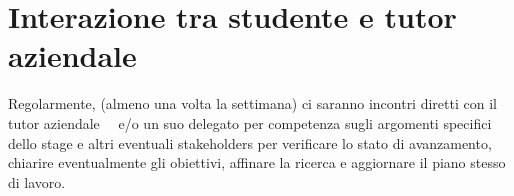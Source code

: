 \section*{Interazione tra studente e tutor aziendale}

Regolarmente, (almeno una volta la settimana) ci saranno incontri diretti con il tutor aziendale \nomeTutorAziendale\ \cognomeTutorAziendale\ e/o un suo delegato per competenza sugli argomenti specifici dello stage e altri eventuali stakeholders per verificare lo stato di avanzamento, chiarire eventualmente gli obiettivi, affinare la ricerca e aggiornare il piano stesso di lavoro.